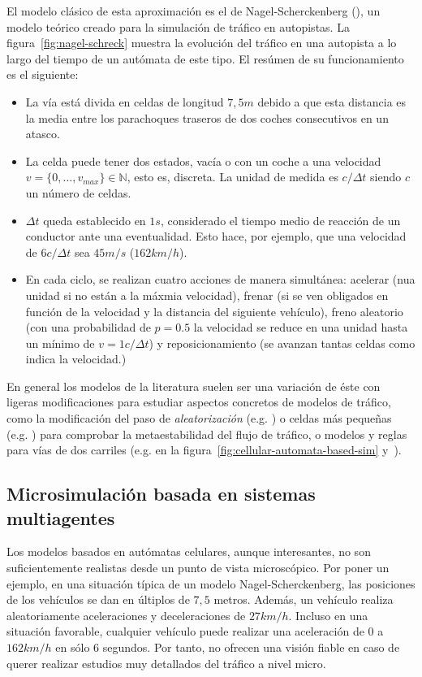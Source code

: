 El modelo clásico de esta aproximación es el de Nagel-Scherckenberg (\cite{Nagel1992}), un modelo teórico creado para la simulación de tráfico en autopistas. La figura~\ref{fig:nagel-schreck} muestra la evolución del tráfico en una autopista a lo largo del tiempo de un autómata de este tipo. El resúmen de su funcionamiento es el siguiente:

\begin{itemize}
	\item La vía está divida en celdas de longitud $7,5m$ debido a que esta distancia es la media entre los parachoques traseros de dos coches consecutivos en un atasco.
	\item La celda puede tener dos estados, vacía o con un coche a una velocidad $v = \{0, \ldots, v_{max}\} \in \mathbb{N}$, esto es, discreta. La unidad de medida es $c/\Delta t$ siendo $c$ un número de celdas.
	\item $\Delta t$ queda establecido en $1s$, considerado el tiempo medio de reacción de un conductor ante una eventualidad. Esto hace, por ejemplo, que una velocidad de $6 c/\Delta t$ sea $45 m/s$ ($162 km/h$).
	\item En cada ciclo, se realizan cuatro acciones de manera simultánea: acelerar (nua unidad si no están a la máxmia velocidad), frenar (si se ven obligados en función de la velocidad y la distancia del siguiente vehículo), freno aleatorio (con una probabilidad de $p = 0.5$ la velocidad se reduce en una unidad hasta un mínimo de $v = 1 c/\Delta t$) y reposicionamiento (se avanzan tantas celdas como indica la velocidad.)
\end{itemize}

En general los modelos de la literatura suelen ser una variación de éste con ligeras modificaciones para estudiar aspectos concretos de modelos de tráfico, como la modificación del paso de \textit{aleatorización} (e.g. \cite{Barlovic1998}) o celdas más pequeñas (e.g. \cite{Krauss1997}) para comprobar la metaestabilidad del flujo de tráfico, o modelos y reglas para vías de dos carriles (e.g. \cite{Brilon1999} en la figura~\ref{fig:cellular-automata-based-sim} y~\cite{Nagel1998}).

\subsection{Microsimulación basada en sistemas multiagentes}

Los modelos basados en autómatas celulares, aunque interesantes, no son suficientemente realistas desde un punto de vista microscópico. Por poner un ejemplo, en una situación típica de un modelo Nagel-Scherckenberg, las posiciones de los vehículos se dan en últiplos de $7,5$ metros. Además, un vehículo realiza aleatoriamente aceleraciones y deceleraciones de $27 km/h$. Incluso en una situación favorable, cualquier vehículo puede realizar una aceleración de $0$ a $162km/h$ en sólo $6$ segundos. Por tanto, no ofrecen una visión fiable en caso de querer realizar estudios muy detallados del tráfico a nivel micro.

